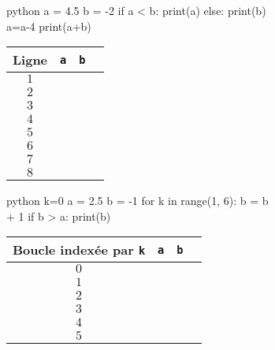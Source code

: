 


\begin{figure}[h]
\begin{subfigure}{.5\textwidth}
\vspace{15pt}
\begin{mintedbox}{python}
a = 4.5
b = -2
if a < b:
	print(a)
else:
	print(b)
a=a-4
print(a+b)
\end{mintedbox}
\end{subfigure}
\hfill
\begin{subfigure}{.4\textwidth}
	\begin{tabular}{|c|c|c|c|}\hline
		Ligne & \texttt{a} & \texttt{b} \\ \hline
		$1$ && \\ \hline
		$2$ && \\ \hline
		$3$ && \\ \hline
		$4$ && \\ \hline
		$5$ && \\ \hline
		$6$ && \\ \hline
		$7$ && \\ \hline
		$8$ && \\ \hline
	\end{tabular}
\end{subfigure}

\begin{subfigure}{.5\textwidth}
\vspace{15pt}
\begin{mintedbox}{python}
k=0
a = 2.5
b = -1
for k in range(1, 6):
	b = b + 1
	if b > a:
		print(b)
\end{mintedbox}
\end{subfigure}
\hfill
\begin{subfigure}{.45\textwidth}
	\begin{tabular}{|c|c|c|c|}\hline
		Boucle indexée par \texttt{k} & \texttt{a} & \texttt{b} \\ \hline
		$0$ && \\ \hline
		$1$ && \\ \hline
		$2$ && \\ \hline
		$3$ && \\ \hline
		$4$ && \\ \hline
		$5$ && \\ \hline
	\end{tabular}
\end{subfigure}


\end{figure}
